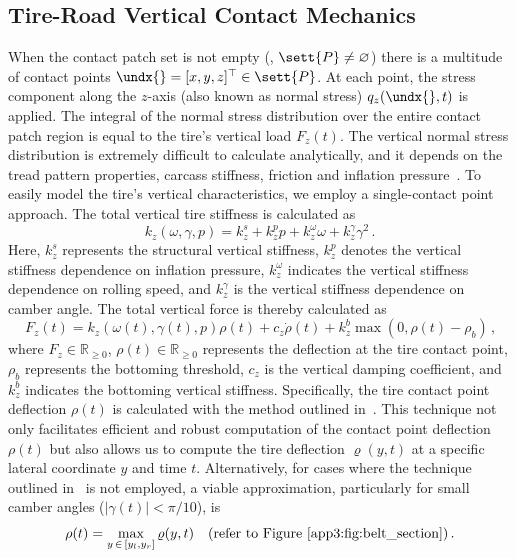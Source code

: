 
\subsection{Tire-Road Vertical Contact Mechanics}
\label{app3:sec:vertical_contact}

When the contact patch set is not empty (\ie{}, $\sett{P} \neq \varnothing$) there is a multitude of contact points $\undx{} = [x,y,z]^\top \in \sett{P}$. At each point, the stress component along the $z$-axis (also known as normal stress) $q_z(\undx{},t)$ is applied. The integral of the normal stress distribution over the entire contact patch region is equal to the tire's vertical load $F_z(t)$. The vertical normal stress distribution is extremely difficult to calculate analytically, and it depends on the tread pattern properties, carcass stiffness, friction and inflation pressure~\cite{nakajima2019advanced}. To easily model the tire's vertical characteristics, we employ a single-contact point approach. The total vertical tire stiffness is calculated as
%
\begin{equation*}
  k_z(\omega, \gamma, p) = k_z^s + k_z^p p + k_z^\omega \omega + k_z^\gamma \gamma^2 \, \text{.}
\end{equation*}
%
Here, $k_z^s$ represents the structural vertical stiffness, $k_z^p$ denotes the vertical stiffness dependence on inflation pressure, $k_z^\omega$ indicates the vertical stiffness dependence on rolling speed, and $k_z^\gamma$ is the vertical stiffness dependence on camber angle. The total vertical force is thereby calculated as
%
\begin{equation}
  F_z(t) = k_z(\omega(t), \gamma(t), p) \rho(t) + c_z \dot{\rho}(t) + k_z^b \max(0, \rho(t)-\rho_b) \, \text{,}
  \label{app3:eq:vertical_force}
\end{equation}
%
where $F_z \in \mathbb{R}_{\geq 0}$, $\rho(t) \in \mathbb{R}_{\geq 0}$ represents the deflection at the tire contact point, $\rho_b$ represents the bottoming threshold, $c_z$ is the vertical damping coefficient, and $k_z^b$ indicates the bottoming vertical stiffness. Specifically, the tire contact point deflection $\rho(t)$ is calculated with the method outlined in~\cite{stocco2024novel, stocco2021acme}. This technique not only facilitates efficient and robust computation of the contact point deflection $\rho(t)$ but also allows us to compute the tire deflection $\varrho(y,t)$ at a specific lateral coordinate $y$ and time $t$. Alternatively, for cases where the technique outlined in~\cite{stocco2024novel} is not employed, a viable approximation, particularly for small camber angles ($|\gamma(t)| < \pi/10$), is
%
\begin{equation*}
  \rho(t) = \max_{y \, \in \, [y_l, y_r]} \varrho(y,t) \quad \text{(refer to \figurename~\ref{app3:fig:belt_section})} \, \text{.}
\end{equation*}

